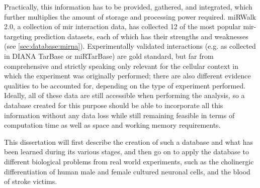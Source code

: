 Practically, this information has to be provided, gathered, and integrated, which further multiplies the amount of storage and processing power required. miRWalk 2.0, a collection of \ac{mir} interaction data, has collected 12 of the most popular \ac{mir}-targeting prediction datasets, each of which has their strengths and weaknesses (see \ref{sec:database:mirna}). Experimentally validated interactions (e.g. as collected in DIANA TarBase or miRTarBase) are gold standard, but far from comprehensive and strictly speaking only relevant for the cellular context in which the experiment was originally performed; there are also different evidence qualities to be accounted for, depending on the type of experiment performed. Ideally, all of these data are still accessible when performing the analysis, so a database created for this purpose should be able to incorporate all this information without any data loss while still remaining feasible in terms of computation time as well as space and working memory requirements. 

This dissertation will first describe the creation of such a database and what has been learned during its various stages, and then go on to apply the database to different biological problems from real world experiments, such as the cholinergic differentiation of human male and female cultured neuronal cells, and the blood of stroke victims.
